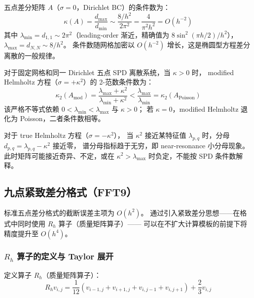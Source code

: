 \begin{corollary}[条件数估计]
  \label{cor:condition_number}
  五点差分矩阵 $A$（$\sigma = 0$，Dirichlet BC）的条件数为：
  \begin{equation}
    \kappa(A) = \frac{d_{\max}}{d_{\min}}
    \sim \frac{8/h^2}{2\pi^2}
    = \frac{4}{\pi^2 h^2} = O(h^{-2})
    \label{eq:condition_number}
  \end{equation}
  其中 $\lambda_{\min} = d_{1,1} \sim 2\pi^2$（leading-order 渐近，精确值为 $8\sin^2(\pi h/2)/h^2$），
  $\lambda_{\max} = d_{N,N} \sim 8/h^2$。
  条件数随网格加密以 $O(h^{-2})$ 增长，这是椭圆型方程差分离散的一般规律。

  对于固定网格和同一 Dirichlet 五点 SPD 离散系统，当 $\kappa>0$ 时，
  modified Helmholtz 方程（$\sigma = +\kappa^2$）的 2-范数条件数为：
  \begin{equation}
    \kappa_2(A_{\mathrm{mod}})
    =
    \frac{\lambda_{\max}+\kappa^2}{\lambda_{\min}+\kappa^2}
    <
    \frac{\lambda_{\max}}{\lambda_{\min}}
    =
    \kappa_2(A_{\mathrm{Poisson}})
    \label{eq:condition_modified}
  \end{equation}
  该严格不等式依赖 $0<\lambda_{\min}<\lambda_{\max}$ 与 $\kappa>0$；
  若 $\kappa=0$，modified Helmholtz 退化为 Poisson，二者条件数相等。

  对于 true Helmholtz 方程（$\sigma = -\kappa^2$），
  当 $\kappa^2$ 接近某特征值 $\lambda_{p,q}$ 时，分母 $d_{p,q}=\lambda_{p,q}-\kappa^2$ 接近零，
  谱分母指标趋于无穷，即 near-resonance 小分母现象。
  此时矩阵可能接近奇异、不定，或在 $\kappa^2>\lambda_{\max}$ 时负定，不能按 SPD 条件数解释。
\end{corollary}

\subsection{九点紧致差分格式（FFT9）}

标准五点差分格式的截断误差主项为 $O(h^2)$。
通过引入紧致差分思想\cite{Lynch1977}——在格式中同时使用 $R_h$ 算子（质量矩阵算子）——
可以在不扩大计算模板的前提下将精度提升至 $O(h^4)$。

\subsubsection{$R_h$ 算子的定义与 Taylor 展开}

定义算子 $R_h$（质量矩阵算子）：
\begin{equation}
  R_h v_{i,j} = \frac{1}{12}(v_{i-1,j} + v_{i+1,j} + v_{i,j-1} + v_{i,j+1})
  + \frac{2}{3}v_{i,j}
  \label{eq:Rh_def}
\end{equation}

